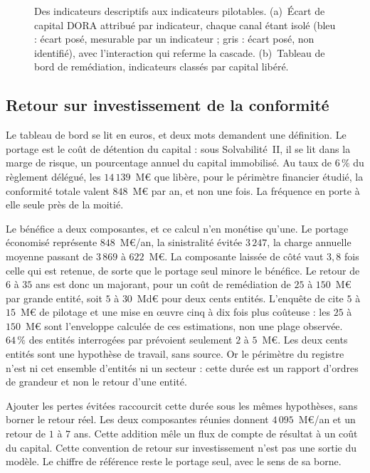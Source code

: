 \begin{figure}[H]\centering
{}
\caption{Des indicateurs descriptifs aux indicateurs pilotables. (a)~Écart de capital DORA attribué
par indicateur, chaque canal étant isolé (bleu : écart posé, mesurable par un indicateur ; gris : écart posé, non identifié), avec l'interaction qui
referme la cascade. (b)~Tableau de bord de remédiation, indicateurs classés par capital libéré.}
\label{fig:kpi}
\end{figure}

\subsection{Retour sur investissement de la conformité}
\label{sec:roi}

Le tableau de bord se lit en euros, et deux mots demandent une définition. Le portage est le coût de
détention du capital : sous Solvabilité~II, il se lit dans la marge de risque, un pourcentage annuel du
capital immobilisé. Au taux de $6\,\%$ du règlement délégué, les $14\,139$~M\euro{} que libère, pour le périmètre financier étudié, la
conformité totale valent $848$~M\euro{} par an, et non une fois. La fréquence en porte à elle seule
près de la moitié.

Le bénéfice a deux composantes, et ce calcul n'en monétise qu'une. Le portage économisé représente
$848$~M\euro/an, la sinistralité évitée $3\,247$, la charge annuelle moyenne passant de $3\,869$ à
$622$~M\euro. La composante laissée de côté vaut $3{,}8$ fois celle qui est retenue, de sorte que le
portage seul minore le bénéfice. Le retour de $6$ à $35$ ans est donc un majorant, pour un coût de
remédiation de $25$ à $150$~M\euro{} par grande entité, soit $5$ à $30$~Md\euro{} pour deux cents
entités. L'enquête de \citet{mckinsey2024} cite $5$ à $15$~M\euro{} de pilotage et une mise en \oe{}uvre cinq à dix
fois plus coûteuse : les $25$ à $150$~M\euro{} sont l'enveloppe calculée de ces estimations, non une plage observée. $64\,\%$ des entités interrogées par \citet{deloitte2025}
prévoient seulement $2$ à $5$~M\euro. Les deux cents entités sont une hypothèse de travail, sans source. Or le
périmètre du registre n'est ni cet ensemble d'entités ni un secteur : cette durée est un rapport d'ordres de
grandeur et non le retour d'une entité.

Ajouter les pertes évitées raccourcit cette durée sous les mêmes hypothèses, sans borner le retour réel. Les deux composantes réunies donnent
$4\,095$~M\euro/an et un retour de $1$ à $7$ ans. Cette addition mêle un flux de compte de résultat à
un coût du capital. Cette convention de retour sur investissement n'est pas une sortie du modèle. Le chiffre de
référence reste le portage seul, avec le sens de sa borne.

